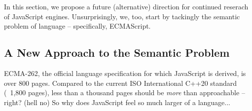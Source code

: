 %
In this section, we propose a future (alternative) direction for continued reserach of JavaScript engines. Unsurprisingly, we, too,
start by tackingly the semantic problem of language -- specifically, ECMAScript.


\subsection{A New Approach to the Semantic Problem}
ECMA-262\cite{ecma-2021}, the official language specification for which JavaScript is derived, is over 800 pages. Compared to the
current ISO International C++20 standard\cite{cpp20} (~1,800 pages), less than a thousand pages should be \textit{more}
than approachable -- right? (hell no) So why does JavaScript feel so much larger of a language... 

